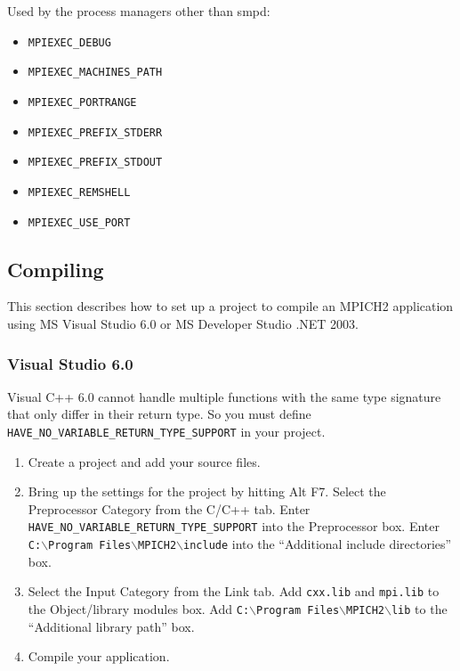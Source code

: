 \documentclass[dvipdfm,11pt]{article}
\begin{document}
Used by the process managers other than smpd:
\begin{itemize}
\item \texttt{MPIEXEC\_DEBUG}
\item \texttt{MPIEXEC\_MACHINES\_PATH}
\item \texttt{MPIEXEC\_PORTRANGE}
\item \texttt{MPIEXEC\_PREFIX\_STDERR}
\item \texttt{MPIEXEC\_PREFIX\_STDOUT}
\item \texttt{MPIEXEC\_REMSHELL}
\item \texttt{MPIEXEC\_USE\_PORT}
\end{itemize}

\subsection{Compiling}
This section describes how to set up a project to compile an MPICH2 application
using MS Visual Studio 6.0 or MS Developer Studio .NET 2003.

\subsubsection{Visual Studio 6.0}
Visual C++ 6.0 cannot handle multiple functions with the same type signature 
that only differ in their return type.  So you must define \texttt{HAVE\_NO\_VARIABLE\_RETURN\_TYPE\_SUPPORT}
in your project.

\begin{enumerate}
\item Create a project and add your source files.

\item Bring up the settings for the project by hitting Alt F7.  Select the Preprocessor
Category from the C/C++ tab.  Enter \texttt{HAVE\_NO\_VARIABLE\_RETURN\_TYPE\_SUPPORT} into
the Preprocessor box.  Enter \texttt{C:$\backslash$Program Files$\backslash$MPICH2$\backslash$include}
into the ``Additional include directories'' box.

\item Select the Input Category from the Link tab.  Add \texttt{cxx.lib} and \texttt{mpi.lib} to
the Object/library modules box.  Add \texttt{C:$\backslash$Program Files$\backslash$MPICH2$\backslash$lib}
to the ``Additional library path'' box.

\item Compile your application.
\end{enumerate}
\end{document}
